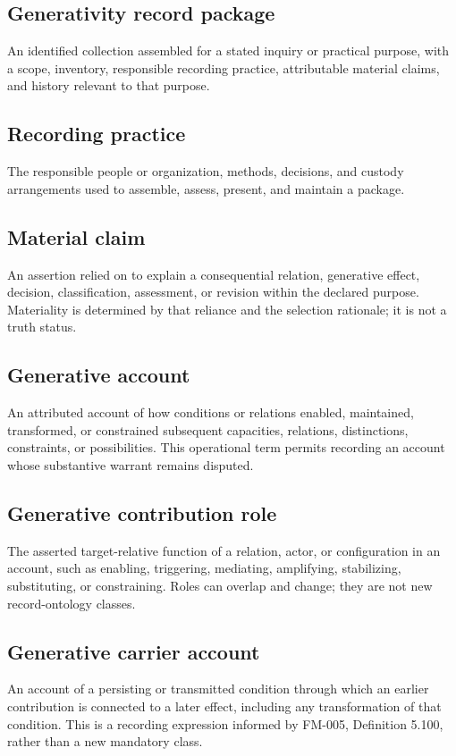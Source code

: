 \documentclass[11pt,a4paper]{article}
\begin{document}
\subsection{Generativity record package}
An identified collection assembled for a stated inquiry or practical purpose, with a scope, inventory, responsible recording practice, attributable material claims, and history relevant to that purpose.

\subsection{Recording practice}
The responsible people or organization, methods, decisions, and custody arrangements used to assemble, assess, present, and maintain a package.

\subsection{Material claim}
An assertion relied on to explain a consequential relation, generative effect, decision, classification, assessment, or revision within the declared purpose. Materiality is determined by that reliance and the selection rationale; it is not a truth status.

\subsection{Generative account}
An attributed account of how conditions or relations enabled, maintained, transformed, or constrained subsequent capacities, relations, distinctions, constraints, or possibilities. This operational term permits recording an account whose substantive warrant remains disputed.

\subsection{Generative contribution role}
The asserted target-relative function of a relation, actor, or configuration in an account, such as enabling, triggering, mediating, amplifying, stabilizing, substituting, or constraining. Roles can overlap and change; they are not new record-ontology classes.

\subsection{Generative carrier account}
An account of a persisting or transmitted condition through which an earlier contribution is connected to a later effect, including any transformation of that condition. This is a recording expression informed by FM-005, Definition 5.100, rather than a new mandatory class.
\end{document}
